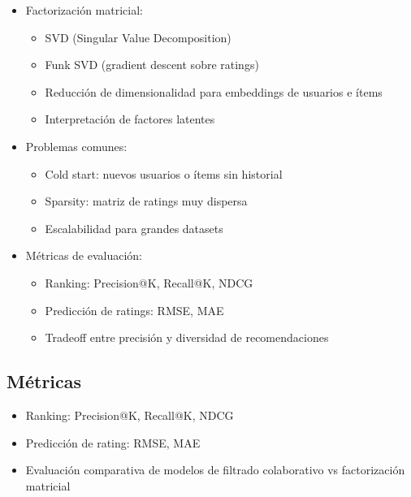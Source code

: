 \documentclass[12pt,a4paper,openany,oneside]{book}
\begin{document}
\begin{itemize}
\begin{itemize}
    \item Factorización matricial:
    \begin{itemize}
        \item SVD (Singular Value Decomposition)
        \item Funk SVD (gradient descent sobre ratings)
        \item Reducción de dimensionalidad para embeddings de usuarios e ítems
        \item Interpretación de factores latentes
    \end{itemize}
    
    \item Problemas comunes:
    \begin{itemize}
        \item Cold start: nuevos usuarios o ítems sin historial
        \item Sparsity: matriz de ratings muy dispersa
        \item Escalabilidad para grandes datasets
    \end{itemize}
    
    \item Métricas de evaluación:
    \begin{itemize}
        \item Ranking: Precision@K, Recall@K, NDCG
        \item Predicción de ratings: RMSE, MAE
        \item Tradeoff entre precisión y diversidad de recomendaciones
    \end{itemize}
\end{itemize}

\subsection{Métricas}
\begin{itemize}
    \item Ranking: Precision@K, Recall@K, NDCG
    \item Predicción de rating: RMSE, MAE
    \item Evaluación comparativa de modelos de filtrado colaborativo vs factorización matricial
\end{itemize}


\end{itemize}
\end{document}
